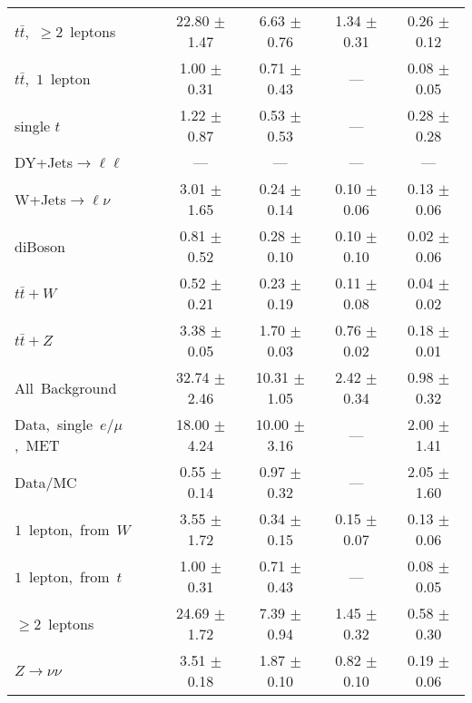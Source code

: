 \documentclass{article}
\begin{document}
\begin{longtable}{|l|c|c|c|c|}
$t\bar{t}$,~$\ge2$~leptons & 22.80 $\pm$ 1.47  & 6.63 $\pm$ 0.76  & 1.34 $\pm$ 0.31  & 0.26 $\pm$ 0.12 \\* 
$t\bar{t}$,~$1$~lepton & 1.00 $\pm$ 0.31  & 0.71 $\pm$ 0.43  & ---  & 0.08 $\pm$ 0.05 \\* 
single $t$  & 1.22 $\pm$ 0.87  & 0.53 $\pm$ 0.53  & ---  & 0.28 $\pm$ 0.28 \\* 
DY+Jets$\rightarrow\ell\ell$  & ---  & ---  & ---  & --- \\* 
W+Jets$\rightarrow\ell\nu$  & 3.01 $\pm$ 1.65  & 0.24 $\pm$ 0.14  & 0.10 $\pm$ 0.06  & 0.13 $\pm$ 0.06 \\* 
diBoson  & 0.81 $\pm$ 0.52  & 0.28 $\pm$ 0.10  & 0.10 $\pm$ 0.10  & 0.02 $\pm$ 0.06 \\* 
$t\bar{t}+W$  & 0.52 $\pm$ 0.21  & 0.23 $\pm$ 0.19  & 0.11 $\pm$ 0.08  & 0.04 $\pm$ 0.02 \\* 
$t\bar{t}+Z$  & 3.38 $\pm$ 0.05  & 1.70 $\pm$ 0.03  & 0.76 $\pm$ 0.02  & 0.18 $\pm$ 0.01 \\* 
\hline \hline 
All~Background  & 32.74 $\pm$ 2.46  & 10.31 $\pm$ 1.05  & 2.42 $\pm$ 0.34  & 0.98 $\pm$ 0.32 \\* 
Data,~single~$e/\mu$,~MET  & 18.00 $\pm$ 4.24  & 10.00 $\pm$ 3.16  & ---  & 2.00 $\pm$ 1.41 \\* 
Data/MC  & 0.55 $\pm$ 0.14  & 0.97 $\pm$ 0.32  & ---  & 2.05 $\pm$ 1.60 \\* 
\hline \hline 
$1$~lepton,~from~$W$  & 3.55 $\pm$ 1.72  & 0.34 $\pm$ 0.15  & 0.15 $\pm$ 0.07  & 0.13 $\pm$ 0.06 \\* 
$1$~lepton,~from~$t$  & 1.00 $\pm$ 0.31  & 0.71 $\pm$ 0.43  & ---  & 0.08 $\pm$ 0.05 \\* 
$\ge2$~leptons  & 24.69 $\pm$ 1.72  & 7.39 $\pm$ 0.94  & 1.45 $\pm$ 0.32  & 0.58 $\pm$ 0.30 \\* 
$Z\rightarrow\nu\nu$  & 3.51 $\pm$ 0.18  & 1.87 $\pm$ 0.10  & 0.82 $\pm$ 0.10  & 0.19 $\pm$ 0.06 \\* 
\hline 
\end{longtable} 

 
 
 
 
\pagebreak 

 
 
 
 
\end{document}
